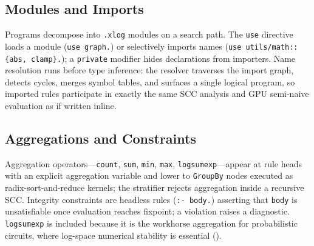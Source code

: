 

\subsection{Modules and Imports}\label{sec:lang:modules}

Programs decompose into \texttt{.xlog} modules on a search path. The \texttt{use} directive loads a module (\texttt{use graph.}) or selectively imports names (\texttt{use utils/math::\{abs, clamp\}.}); a \texttt{private} modifier hides declarations from importers. Name resolution runs before type inference: the resolver traverses the import graph, detects cycles, merges symbol tables, and surfaces a single logical program, so imported rules participate in exactly the same SCC analysis and GPU semi-naive evaluation as if written inline.





\subsection{Aggregations and Constraints}\label{sec:lang:agg}

Aggregation operators---\texttt{count}, \texttt{sum}, \texttt{min}, \texttt{max}, \texttt{logsumexp}---appear at rule heads with an explicit aggregation variable and lower to \texttt{GroupBy} nodes executed as radix-sort-and-reduce kernels; the stratifier rejects aggregation inside a recursive SCC. Integrity constraints are headless rules (\texttt{:- body.}) asserting that \texttt{body} is unsatisfiable once evaluation reaches fixpoint; a violation raises a diagnostic. \texttt{logsumexp} is included because it is the workhorse aggregation for probabilistic circuits, where log-space numerical stability is essential ().



